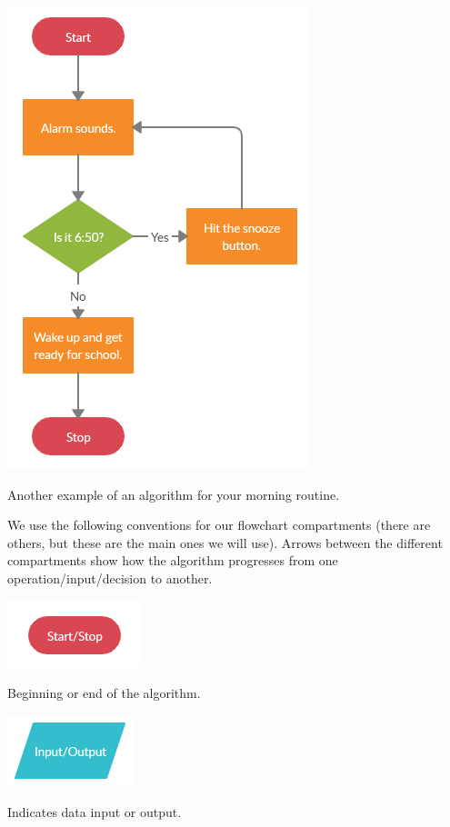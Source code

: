 \documentclass{ximera}
\begin{document}
\begin{center}
	\includegraphics{morning2.png}
\end{center}
\begin{center}
	Another example of an algorithm for your morning routine.
\end{center}

We use the following conventions for our flowchart compartments (there are others, but these are the main ones we will use). Arrows between the different compartments show how the algorithm progresses from one operation/input/decision to another.

\begin{center}
	\includegraphics{startstop.png}
\end{center}
\begin{center}
	Beginning or end of the algorithm.
\end{center}

\begin{center}
	\includegraphics{io.png}
\end{center}
\begin{center}
	Indicates data input or output.
\end{center}
\end{document}
